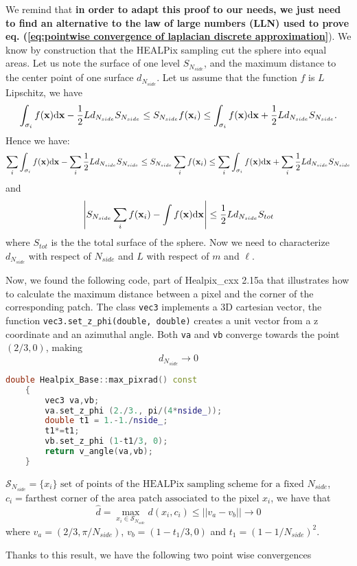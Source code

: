 We remind that \textbf{in order to adapt this proof to our needs, we just need to find an alternative to the law of large numbers (LLN) used to prove eq. (\ref{eq:pointwise convergence of laplacian discrete approximation}}). We know by construction that the HEALPix sampling cut the sphere into equal areas. Let us note the surface of one level $S_{N_{side}}$, and the maximum distance to the center point of one surface\textbf{ $d_{N_{side}}$}.
Let us assume that the function $f$ is $L$ Lipschitz, we have
\[
\int_{\sigma_{i}}f({\bf x})\text{d}{\bf x}-\frac{1}{2}Ld_{N_{side}}S_{N_{side}}\leq S_{N_{side}}f({\bf x}_{i})\leq\int_{\sigma_{i}}f({\bf x})\text{d}{\bf x}+\frac{1}{2}Ld_{N_{side}}S_{N_{side}}.
\]
Hence we have:
\[
\sum_{i}\int_{\sigma_{i}}f({\bf x})\text{d}{\bf x}-\sum_{i}\frac{1}{2}Ld_{N_{side}}S_{N_{side}}\leq S_{N_{side}}\sum_{i}f({\bf x}_{i})\leq\sum_{i}\int_{\sigma_{i}}f({\bf x})\text{d}{\bf x}+\sum_{i}\frac{1}{2}Ld_{N_{side}}S_{N_{side}}
\]
and 
\[
\left|S_{N_{side}}\sum_{i}f({\bf x}_{i})-\int f({\bf x})\text{d}{\bf x}\right|\le\frac{1}{2}Ld_{N_{side}}S_{tot}
\]
where $S_{tot}$ is the the total surface of the sphere. Now we need to characterize $d_{N_{side}}$ with respect of $N_{side}$ and $L$ with respect of $m$ and $\ell$. 

Now, we found the following code, part of Healpix\_cxx 2.15a \cite{Healpix_cc} that illustrates how to calculate the maximum distance between a pixel and the corner of the corresponding patch. The class \lstinline|vec3| implements a 3D cartesian vector, the function \lstinline|vec3.set_z_phi(double, double)| creates a unit vector from a z coordinate and an azimuthal angle. Both \lstinline|va| and \lstinline|vb| converge towards the point $(2/3, 0)$, making $$d_{N_{side}}\rightarrow0$$
\begin{lstlisting}[language=c++]
	double Healpix_Base::max_pixrad() const
	{
		vec3 va,vb;
		va.set_z_phi (2./3., pi/(4*nside_));
		double t1 = 1.-1./nside_;
		t1*=t1;
		vb.set_z_phi (1-t1/3, 0);
		return v_angle(va,vb);
	}
\end{lstlisting}
$\mathcal S_{N_{side}} = \{x_i\}  \text{ set of points of the HEALPix sampling scheme for a fixed }N_{side}$,\\$c_i = \text{farthest corner of the area patch associated to the pixel }x_i$, we have that 
$$\hat d=\max_{x_i\in \mathcal S_{N_{side}}}d(x_i, c_i) \leq ||v_a-v_b||\rightarrow 0$$
where $v_a = (2/3, \pi/N_{side})$, $v_b = (1-t_1/3, 0)$ and $t_1=(1-1/N_{side})^2$.

Thanks to this result, we have the following two point wise convergences

